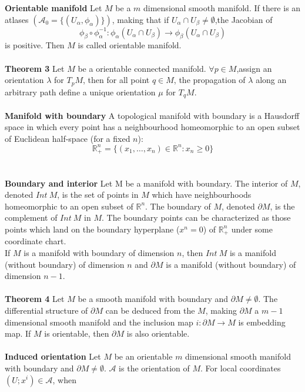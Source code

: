 \documentclass{article}
\begin{document}
\textbf{Orientable manifold} Let $M$ be a $m$ dimensional smooth manifold. If there is an atlases $(\mathcal{A_0} = \{(U_{\alpha},\phi_{\alpha})\})$, making that if $U_{\alpha} \cap U_{\beta} \neq \emptyset$,the Jacobian of
\[\phi_{\beta} \circ \phi_{\alpha}^{-1} : \phi_{\alpha}(U_{\alpha} \cap U_{\beta}) \to \phi_{\beta}(U_{\alpha} \cap U_{\beta})\]
is positive. Then $M$ is called orientable manifold.\\ \\
\textbf{Theorem 3} Let $M$ be a orientable connected manifold. $\forall p \in M$,assign an orientation $\lambda$ for $T_pM$, then for all point $q \in M$, the propagation of $\lambda$ along an arbitrary path define a unique orientation $\mu$ for $T_q M$.\\ \\
\textbf{Manifold with boundary} A topological manifold with boundary is a Hausdorff space in which every point has a neighbourhood homeomorphic to an open subset of Euclidean half-space (for a fixed $n$):
\[\mathbb {R} _{+}^{n}=\{(x_{1},\ldots ,x_{n})\in \mathbb {R} ^{n}:x_{n}\geq 0\}\]\\ \\
\textbf{Boundary and interior} Let M be a manifold with boundary. The interior of $M$, denoted $Int \ M$, is the set of points in $M$ which have neighbourhoods homeomorphic to an open subset of $\mathbb {R} ^{n}$. The boundary of $M$, denoted $\partial M$, is the complement of $Int \ M$ in $M$. The boundary points can be characterized as those points which land on the boundary hyperplane ($x^n=0$) of $ \mathbb {R} _{+}^{n}$ under some coordinate chart.\\
If $M$ is a manifold with boundary of dimension $n$, then $Int \ M$ is a manifold (without boundary) of dimension $n$ and $\partial M$ is a manifold (without boundary) of dimension $n-1$.\\ \\
\textbf{Theorem 4} Let $M$ be a smooth manifold with boundary and $\partial M \neq \emptyset$. The differential structure of $\partial M$ can be deduced from the $M$, making $\partial M$ a $m-1$ dimensional smooth manifold and the inclusion map $i:\partial M \to M$ is embedding map. If $M$ is orientable, then $\partial M$ is also orientable.\\ \\
\textbf{Induced orientation} Let $M$ be an orientable $m$ dimensional smooth manifold with boundary and $\partial M \neq \emptyset$. $\mathcal{A}$ is the orientation of $M$. For local coordinates $(U;x^i) \in \mathcal{A}$, when 
\end{document}
